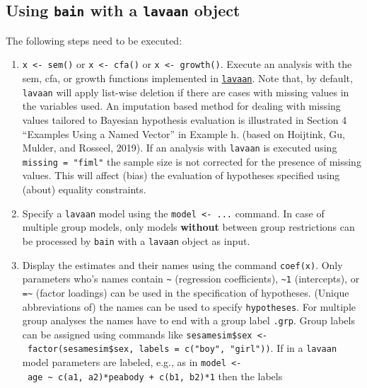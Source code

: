 \documentclass[
]{book}
\providecommand{\tightlist}{%
  \setlength{\itemsep}{0pt}\setlength{\parskip}{0pt}}
\begin{document}
\hypertarget{using-bain-with-a-lavaan-object}{%
\subsection{\texorpdfstring{Using \texttt{bain} with a \texttt{lavaan} object}{Using bain with a lavaan object}}\label{using-bain-with-a-lavaan-object}}

The following steps need to be executed:

\begin{enumerate}
\def\labelenumi{\arabic{enumi})}
\tightlist
\item
  \texttt{x\ \textless{}-\ sem()} or \texttt{x\ \textless{}-\ cfa()} or \texttt{x\ \textless{}-\ growth()}.
  Execute an analysis with the sem, cfa, or growth functions
  implemented in \href{https://lavaan.ugent.be}{\texttt{lavaan}}.
  Note that, by default,
  \texttt{lavaan} will apply list-wise deletion if there are cases with
  missing values in the variables used. An imputation based method
  for dealing with missing values tailored to Bayesian hypothesis
  evaluation is illustrated in Section 4 ``Examples Using
  a Named Vector'' in Example h. (based on Hoijtink, Gu, Mulder,
  and Rosseel, 2019). If an analysis with \texttt{lavaan} is executed using \texttt{missing\ =\ "fiml"} the sample size is not corrected for the presence of missing values. This will affect (bias) the evaluation of hypotheses specified using (about) equality constraints.\\
\item
  Specify a \texttt{lavaan} model using the \texttt{model\ \textless{}-\ ...} command. In case
  of multiple group models, only models \textbf{without} between group
  restrictions can be processed by \texttt{bain} with a \texttt{lavaan} object
  as input.
\item
  Display the estimates and their names using the command \texttt{coef(x)}.
  Only parameters who's names contain \texttt{\textasciitilde{}} (regression coefficients),
  \texttt{\textasciitilde{}1} (intercepts), or \texttt{=\textasciitilde{}} (factor loadings) can be used in the
  specification of hypotheses. (Unique abbreviations of) the names
  can be used to specify \texttt{hypotheses}. For multiple group analyses
  the names have to end with a group label \texttt{.grp}. Group labels
  can be assigned using commands like
  \texttt{sesamesim\$sex\ \textless{}-\ factor(sesamesim\$sex,\ labels\ =\ c("boy",\ "girl"))}.
  If in a \texttt{lavaan} model parameters are labeled, e.g., as in
  \texttt{model\ \textless{}-\ \textquotesingle{}age\ \textasciitilde{}\ c(a1,\ a2)*peabody\ +\ c(b1,\ b2)*1} then the labels

\end{enumerate}
\end{document}
